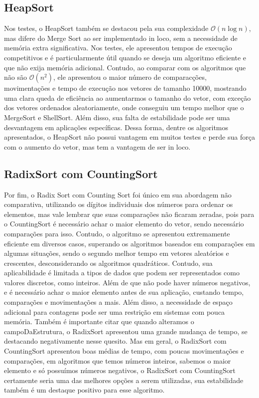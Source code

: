 \documentclass[a4paper, 12pt]{article}
\begin{document}
\subsection{HeapSort}
Nos testes, o HeapSort também se destacou pela sua complexidade \( \mathcal{O}(n \log n) \), mas difere do Merge Sort ao ser implementado in loco, sem a necessidade de memória extra significativa. Nos testes, ele apresentou tempos de execução competitivos e é particularmente útil quando se deseja um algoritmo eficiente e que não exija memória adicional. Contudo, ao comparar com os algoritmos que não são \( \mathcal{O}(n^2) \), ele apresentou o maior número de comparacções, movimentações e tempo de execução nos vetores de tamanho 10000, mostrando uma clara queda de eficiência ao aumentarmos o tamanho do vetor, com exceção dos vetores ordenados aleatoriamente, onde conseguiu um tempo melhor que o MergeSort e ShellSort. Além disso, sua falta de estabilidade pode ser uma desvantagem em aplicações específicas. Dessa forma, dentre os algoritmos apresentados, o HeapSort não possui vantagem em muitos testes e perde sua força com o aumento do vetor, mas tem a vantagem de ser in loco.

\subsection{RadixSort com CountingSort}
Por fim, o Radix Sort com Counting Sort foi único em sua abordagem não comparativa, utilizando os dígitos individuais dos números para ordenar os elementos, mas vale lembrar que suas comparações não ficaram zeradas, pois para o CountingSort é necessário achar o maior elemento do vetor, sendo necessário comparações para isso. Contudo, o algoritmo se apresentou extremamente eficiente em diversos casos, superando os algoritmos baseados em comparações em algumas situações, sendo o segundo melhor tempo em vetores aleatórios e crescentes, desconsiderando os algoritmos quadráticos. Contudo, sua aplicabilidade é limitada a tipos de dados que podem ser representados como valores discretos, como inteiros. Além de que não pode haver números negativos, e é necessário achar o maior elemento antes de sua aplicação, custando tempo, comparações e movimentações a mais. Além disso, a necessidade de espaço adicional para contagens pode ser uma restrição em sistemas com pouca memória. Também é importante citar que quando alteramos o campoDaEstrutura, o RadixSort apresentou uma grande mudança de tempo, se destacando negativamente nesse quesito. Mas em geral, o RadixSort com CountingSort apresentou boas médias de tempo, com poucas movimentações e comparações, em algoritmos que temos números inteiros, sabemos o maior elemento e só possuímos números negativos, o RadixSort com CountingSort certamente seria uma das melhores opções a serem utilizadas, sua estabilidade também é um destaque positivo para esse algoritmo.
\end{document}
